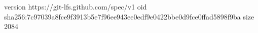 version https://git-lfs.github.com/spec/v1
oid sha256:7c97039a8fce9f3913b5e7f96ee943ee0edf9e0422bbe0d9fce0ffad5898f9ba
size 2084
